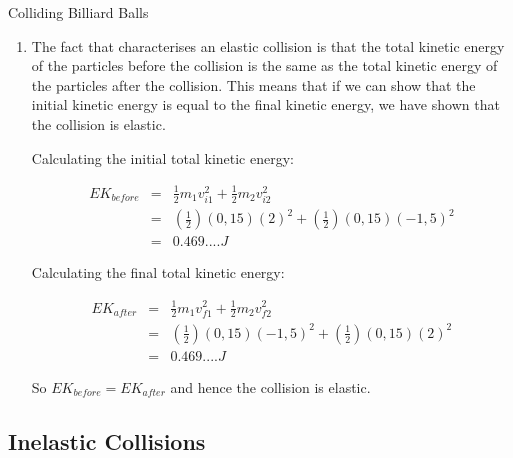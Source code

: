 \begin{wex}{Colliding Billiard Balls}
{\begin{enumerate}
{\begin{eqnarray*}
p_{before}&=&p_{after}\\
m_1v_{i1}+m_2v_{i2}&=&m_1v_{f1}+m_2v_{f2}\\
\left( \frac{150}{1000}\right) (2)+\left( \frac{150}{1000} \right)(-1,5) &=& \left( \frac{150}{1000} \right)(-1,5)+\left( \frac{150}{1000} \right)(v_{f2})\\
0,3-0,225&=&-0,225+0,15v_{f2}\\
v_{f2}&=&3\ems
\end{eqnarray*}

So after the collision, ball 2 moves with a velocity of $3\ems$.
}
\item {


The fact that characterises an elastic collision is that the total kinetic energy of the particles before the collision is the same as the total kinetic energy of the particles after the collision. This means that if we can show that the initial kinetic energy is equal to the final kinetic energy, we have shown that the collision is elastic.

Calculating the initial total kinetic energy:

\begin{eqnarray*}
EK_{before}&=&\frac{1}{2}m_1v_{i1}^2+\frac{1}{2}m_2v_{i2}^2\\
&=&\left(\frac{1}{2}\right) (0,15)(2)^2+\left(\frac{1}{2}\right)(0,15)(-1,5)^2\\
&=&0.469....J
\end{eqnarray*}

Calculating the final total kinetic energy:

\begin{eqnarray*}
EK_{after}&=&\frac{1}{2}m_1v_{f1}^2+\frac{1}{2}m_2v_{f2}^2\\
&=&\left(\frac{1}{2}\right)(0,15)(-1,5)^2+\left(\frac{1}{2}\right) (0,15)(2)^2\\
&=&0.469....J
\end{eqnarray*}

So $EK_{before}=EK_{after}$ and hence the collision is elastic.
}
\end{enumerate}
}
\end{wex}


\subsection{Inelastic Collisions}

